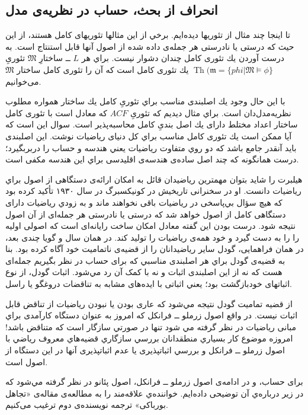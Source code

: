 \documentclass[12pt,a4paper]{report}
\theoremstyle{colorhead}
\DeclareMathOperator{\Th}{Th}
\begin{document}
\subsection{انحراف از بحث، حساب در نظریه‌ی مدل}
تا اينجا چند مثال از تئوریها ديده‌ايم. برخي از اين مثالها تئوریهای كامل هستند، از اين حيث كه درستی يا نادرستی هر جمله‌ی داده شده از اصول آنها قابل استنتاج است. به درست آوردن يك تئوری كامل چندان دشوار نيست. براي هر
$L$ ـ‌ـ
ساختارِ
$\mathfrak{M}$
تئوریِ
$\Th(\mathfrak{m}=\{phi| \mathfrak{M}\models \phi\}$ 
يك تئوری كامل است كه آن را تئوری كامل ساختار
$\mathfrak{M}$
می‌خوانیم.
\par 
 با اين حال وجود يك اصلبندی مناسب براي تئوریِ
  كامل يك ساختار همواره مطلوب نظريه‌مدل‌دان است. 
  براي مثال ديديم كه تئوریِ
$ACF$
كه معادل است با تئوری كامل ساختار اعداد مختلط
دارای يك اصل بندی‌ِ كامل  محاسبه‌پذير است.
 سوال اين است كه آيا ممکن است يك تئوری كامل مناسب براي كل دنیای رياضيات نوشت. اين اصلبندی بايد آنقدر جامع باشد كه دو روي متفاوت رياضيات يعني هندسه و حساب را دربربگيرد؛ درست همانگونه كه چند اصل ساده‌ی هندسه‌ی اقليدسی براي اين هندسه مكفی است. 
\par
هيلبرت را شايد بتوان مهمترين رياضيدان قائل به امکان  ارائه‌ی دستگاهی از اصول براي ریاضیات دانست. 
او در سخنرانی تاريخيش در کونیکسبرگ
در سال 
۱۹۳۰
تأکید 
كرده بود كه هيچ سؤال بي‌پاسخی 
در ریاضیات
باقی نخواهند ماند
و به زودي رياضيات دارای دستگاهی كامل از اصول خواهد شد كه درستی یا نادرستی هر جمله‌ای
از آن اصول نتيجه شود. درست بودن اين گفته معادل امكان ساخت رايانه‌ای است كه اصولی اوليه را را به دست گيرد و خود همه‌ی رياضيات را توليد كند.  در همان سال و گويا چندی بعد،‌ در همان فراهمايی، گودل سایر رياضيدانان را از قضيه‌ی ناتماميت  خود آگاه كرده بود. بنا به قضيه‌ی گودل براي هر اصلبندی مناسبي كه برای حساب در نظر بگيريم جمله‌ای هست كه نه از این اصلبندی  اثبات و نه با کمک آن رد مي‌شود. اثبات گودل، 
از نوع
اثباتهای خود‌بازگشت بود؛
يعني اثباتی با ایده‌های  مشابه به تناقضات دروغگو يا راسل. 
\par
از قضيه تماميت گودل نتيجه مي‌شود كه عاری بودن يا نبودن رياضيات از تناقض قابل اثبات نيست. در واقع اصول زرملو ــ فرانكل كه امروز به عنوان دستگاه کارآمدی براي مبانی رياضيات در نظر گرفته مي شود تنها در صورتي سازگار است كه متناقض باشد! امروزه موضوع كار بسياري منطقدانان بررسي سازگاري قضيه‌هاي معروف رياضي با اصول زرملو ــ فرانكل و بررسي اثباتپذيری يا عدم اثباتپذيری آنها در اين دستگاه از اصول است. 
\par 
برای حساب،‌ و در ادامه‌ی اصول زرملو ــ‌ فرانکل،
اصول پئانو در نظر گرفته مي‌شود كه در زير درباره‌ي آن توضیحی داده‌ايم. خواننده‌ي علاقه‌مند  را به مطالعه‌ی مقاله‌ی «تجاهل بورباكی» ترجمه نويسنده‌ی دوم ترغيب می‌كنيم. 
\end{document}
